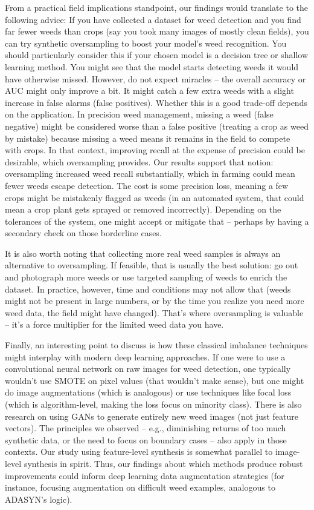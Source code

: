 \documentclass[agriengineering,article,submit,pdftex,moreauthors]{Definitions/mdpi}
\begin{document}
From a practical field implications standpoint, our findings would translate to the following advice: If you have collected a dataset for weed detection and you find far fewer weeds than crops (say you took many images of mostly clean fields), you can try synthetic oversampling to boost your model’s weed recognition. You should particularly consider this if your chosen model is a decision tree or shallow learning method. You might see that the model starts detecting weeds it would have otherwise missed. However, do not expect miracles – the overall accuracy or AUC might only improve a bit. It might catch a few extra weeds with a slight increase in false alarms (false positives). Whether this is a good trade-off depends on the application. In precision weed management, missing a weed (false negative) might be considered worse than a false positive (treating a crop as weed by mistake) because missing a weed means it remains in the field to compete with crops. In that context, improving recall at the expense of precision could be desirable, which oversampling provides. Our results support that notion: oversampling increased weed recall substantially, which in farming could mean fewer weeds escape detection. The cost is some precision loss, meaning a few crops might be mistakenly flagged as weeds (in an automated system, that could mean a crop plant gets sprayed or removed incorrectly). Depending on the tolerances of the system, one might accept or mitigate that – perhaps by having a secondary check on those borderline cases.

It is also worth noting that collecting more real weed samples is always an alternative to oversampling. If feasible, that is usually the best solution: go out and photograph more weeds or use targeted sampling of weeds to enrich the dataset. In practice, however, time and conditions may not allow that (weeds might not be present in large numbers, or by the time you realize you need more weed data, the field might have changed). That’s where oversampling is valuable – it’s a force multiplier for the limited weed data you have.

Finally, an interesting point to discuss is how these classical imbalance techniques might interplay with modern deep learning approaches. If one were to use a convolutional neural network on raw images for weed detection, one typically wouldn’t use SMOTE on pixel values (that wouldn’t make sense), but one might do image augmentations (which is analogous) or use techniques like focal loss (which is algorithm-level, making the loss focus on minority class). There is also research on using GANs to generate entirely new weed images (not just feature vectors). The principles we observed – e.g., diminishing returns of too much synthetic data, or the need to focus on boundary cases – also apply in those contexts. Our study using feature-level synthesis is somewhat parallel to image-level synthesis in spirit. Thus, our findings about which methods produce robust improvements could inform deep learning data augmentation strategies (for instance, focusing augmentation on difficult weed examples, analogous to ADASYN’s logic).
\end{document}
